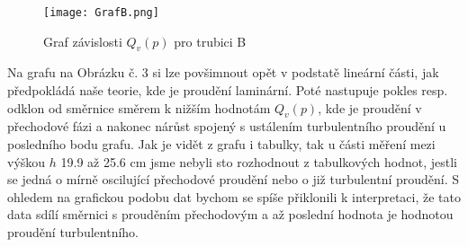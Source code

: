\documentclass[a4paper]{article}
\begin{document}
\begin{figure}[H]
\centering
\texttt{[image: GrafB.png]}
\caption{Graf závislosti $Q_{v}(p)$ pro trubici B}
\end{figure}
\par Na grafu na Obrázku č. 3 si lze povšimnout opět v podstatě lineární části, jak předpokládá naše teorie, kde je proudění laminární. Poté nastupuje pokles resp. odklon od směrnice směrem k nižším hodnotám $Q_{v}(p)$, kde je proudění v přechodové fázi a nakonec nárůst spojený s ustálením turbulentního proudění u posledního bodu grafu. Jak je vidět z grafu i tabulky, tak u části měření mezi výškou $h$ 19.9 až 25.6 cm jsme nebyli sto rozhodnout z tabulkových hodnot, jestli se jedná o mírně oscilující přechodové proudění nebo o již turbulentní proudění. S ohledem na grafickou podobu dat bychom se spíše přiklonili k interpretaci, že tato data sdílí směrnici s prouděním přechodovým a až poslední hodnota je hodnotou proudění turbulentního.
\newpage
\end{document}
